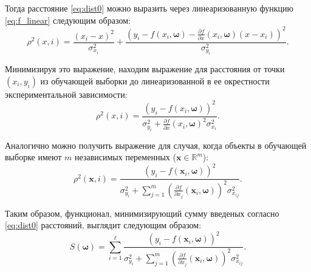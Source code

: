\documentclass[tikz,11pt,a4paper]{article}
\newcommand{\bomega}{\boldsymbol{\omega}}
\begin{document}
Тогда расстояние \eqref{eq:dist0} можно выразить через линеаризованную функцию
\eqref{eq:f_linear} следующим образом:
\begin{equation}
  \rho^2(x, i) = \frac{(x_i - x)^2}{\sigma_{x_i}^2} + \frac{(y_i - f(x_i, \bomega) - \frac{\partial f}{\partial x}(x_i, \bomega) (x - x_i))^2}{\sigma_{y_i}^2}.
  \label{eq:dist_linear}
\end{equation}

Минимизируя это выражение, находим выражение для расстояния от
точки $(x_i, y_i)$ из обучающей выборки до линеаризованной в ее
окрестности экспериментальной зависимости:
\begin{equation}
  \rho^2(x, i) = \frac{(y_i - f(x_i, \bomega))^2}{\sigma^2_{y_i} + \frac{\partial f}{\partial x}(x_i, \bomega)^2 \sigma^2_{x_i}}.
  \label{eq:rho_univar}
\end{equation}

Аналогично можно получить выражение для случая, когда объекты в обучающей выборке
имеют $m$ независимых переменных ($\mathbf{x} \in \mathbb{R}^m$):
\[
  \rho^2(\mathbf{x}, i) = \frac{(y_i - f(\mathbf{x}_i, \bomega))^2}{\sigma_{y_i}^2 + \sum_{j = 1}^m (\frac{\partial f}{\partial x_j}(\mathbf{x}_i, \bomega))^2 \sigma^2_{x_{ij}}}.
\]

Таким образом, функционал, минимизирующий сумму введеных согласно \eqref{eq:dist0}
расстояний, выглядит следующим образом:
\begin{equation}
  S(\bomega) = \sum_{i = 1}^\ell \frac{(y_i - f(\mathbf{x}_i, \bomega))^2}{\sigma_{y_i}^2 + \sum_{j = 1}^m (\frac{\partial f}{\partial x_j}(\mathbf{x}_i, \bomega))^2 \sigma^2_{x_{ij}}}.
  \label{eq:s}
\end{equation}
\end{document}
